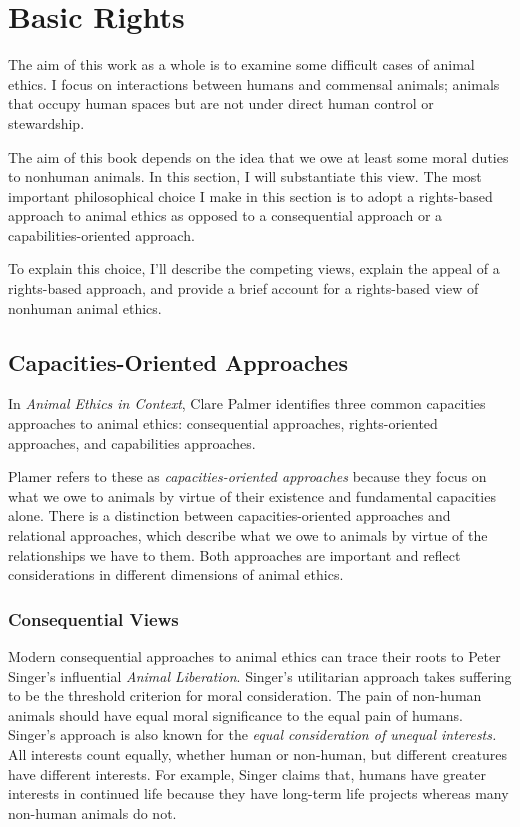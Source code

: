 \chapter{Basic Rights}

	The aim of this work as a whole is to examine some difficult cases of
	animal ethics. I focus on interactions between humans and commensal
	animals; animals that occupy human spaces but are not under direct human
	control or stewardship.

	The aim of this book depends on the idea that we owe at least some moral
	duties to nonhuman animals. In this section, I will substantiate this view.
	The most important philosophical choice I make in this section is to adopt
	a rights-based approach to animal ethics as opposed to a consequential
	approach or a capabilities-oriented approach.

	To explain this choice, I’ll describe the competing views, explain the
	appeal of a rights-based approach, and provide a brief account for a
	rights-based view of nonhuman animal ethics.

	\section{Capacities-Oriented Approaches}	

	In \emph{Animal Ethics in Context}, Clare Palmer identifies three common
	capacities approaches to animal ethics: consequential approaches,
	rights-oriented approaches, and capabilities approaches.\autocite[Ch.
	2]{palmer_animal_context}

	Plamer refers to these as \emph{capacities-oriented approaches} because
	they focus on what we owe to animals by virtue of their existence and
	fundamental capacities alone. There is a distinction between
	capacities-oriented approaches and relational approaches, which describe
	what we owe to animals by virtue of the relationships we have to them.
	Both approaches are important and reflect considerations in different
	dimensions of animal ethics.

	\subsection{Consequential Views}

	Modern consequential approaches to animal ethics can trace their roots to
	Peter Singer’s influential \emph{Animal Liberation}. Singer’s utilitarian
	approach takes suffering to be the threshold criterion for moral
	consideration.  The pain of non-human animals should have equal moral
	significance to the equal pain of humans. Singer’s approach is also known
	for the \emph{equal consideration of unequal interests.} All interests
	count equally, whether human or non-human, but different creatures have
	different interests. For example, Singer claims that, humans have greater
	interests in continued life because they have long-term life projects
	whereas many non-human animals do not.

